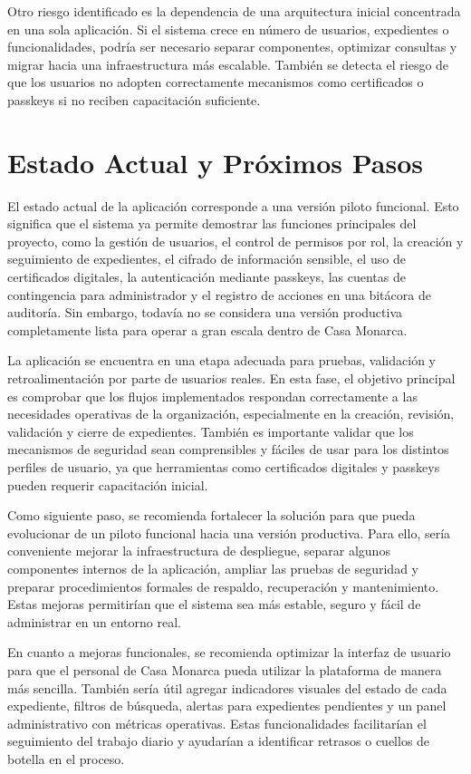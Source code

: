 \documentclass[10pt, letterpaper]{article}
\begin{document}
Otro riesgo identificado es la dependencia de una arquitectura inicial concentrada en una sola aplicación. Si el sistema crece en número de usuarios, expedientes o funcionalidades, podría ser necesario separar componentes, optimizar consultas y migrar hacia una infraestructura más escalable. También se detecta el riesgo de que los usuarios no adopten correctamente mecanismos como certificados o passkeys si no reciben capacitación suficiente.

\section{Estado Actual y Próximos Pasos}

El estado actual de la aplicación corresponde a una versión piloto funcional. Esto significa que el sistema ya permite demostrar las funciones principales del proyecto, como la gestión de usuarios, el control de permisos por rol, la creación y seguimiento de expedientes, el cifrado de información sensible, el uso de certificados digitales, la autenticación mediante passkeys, las cuentas de contingencia para administrador y el registro de acciones en una bitácora de auditoría. Sin embargo, todavía no se considera una versión productiva completamente lista para operar a gran escala dentro de Casa Monarca.

La aplicación se encuentra en una etapa adecuada para pruebas, validación y retroalimentación por parte de usuarios reales. En esta fase, el objetivo principal es comprobar que los flujos implementados respondan correctamente a las necesidades operativas de la organización, especialmente en la creación, revisión, validación y cierre de expedientes. También es importante validar que los mecanismos de seguridad sean comprensibles y fáciles de usar para los distintos perfiles de usuario, ya que herramientas como certificados digitales y passkeys pueden requerir capacitación inicial.

Como siguiente paso, se recomienda fortalecer la solución para que pueda evolucionar de un piloto funcional hacia una versión productiva. Para ello, sería conveniente mejorar la infraestructura de despliegue, separar algunos componentes internos de la aplicación, ampliar las pruebas de seguridad y preparar procedimientos formales de respaldo, recuperación y mantenimiento. Estas mejoras permitirían que el sistema sea más estable, seguro y fácil de administrar en un entorno real.

En cuanto a mejoras funcionales, se recomienda optimizar la interfaz de usuario para que el personal de Casa Monarca pueda utilizar la plataforma de manera más sencilla. También sería útil agregar indicadores visuales del estado de cada expediente, filtros de búsqueda, alertas para expedientes pendientes y un panel administrativo con métricas operativas. Estas funcionalidades facilitarían el seguimiento del trabajo diario y ayudarían a identificar retrasos o cuellos de botella en el proceso.
\end{document}
